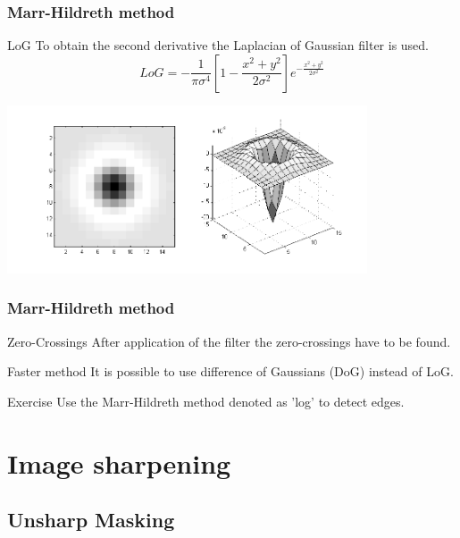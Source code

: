\documentclass{beamer}
\begin{document}
\begin{frame}
\frametitle{Marr-Hildreth method}
  \begin{block}{LoG}
  To obtain the second derivative the Laplacian of Gaussian filter is used.
  \begin{equation*}
  LoG = -\frac{1}{\pi \sigma^4} \left[ 1 - \frac{x^2 + y^2}{2\sigma^2} \right] e^{-\frac{x^2+y^2}{2\sigma^2}}
  \end{equation*}  
  \end{block}
    
  \begin{center}
  \includegraphics[width=0.8\textwidth]{laplacian_of_gaussian.png}
  \end{center}
\end{frame}

\begin{frame}
\frametitle{Marr-Hildreth method}
  \begin{block}{Zero-Crossings}
  After application of the filter the zero-crossings have to be found.
  \end{block}
  
  \begin{block}{Faster method}
  It is possible to use difference of Gaussians (DoG) instead of LoG.
  \end{block}   
  
  \begin{block}{Exercise}
  Use the Marr-Hildreth method denoted as 'log' to detect edges.
  \end{block}     
\end{frame}


\section{Image sharpening}
\subsection{Unsharp Masking}
\end{document}
